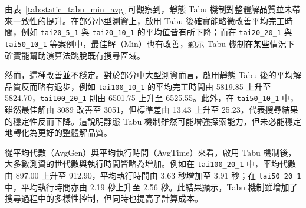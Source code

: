 \documentclass[conference]{IEEEtran}
\begin{document}
\begin{table}[htbp]
\caption{比較有無static tabu mechanism之平均與最小Makespan}
\label{tab:static_tabu_min_avg}
\centering
{}
\end{table}

由表~\ref{tab:static_tabu_min_avg} 可觀察到，靜態 Tabu 機制對整體解品質並未帶來一致性的提升。在部分小型測資上，啟用 Tabu 後確實能略微改善平均完工時間，例如 \texttt{tai20\_5\_1} 與 \texttt{tai20\_10\_1} 的平均值皆有所下降；而在 \texttt{tai20\_20\_1} 與 \texttt{tai50\_10\_1} 等案例中，最佳解（Min）也有改善，顯示 Tabu 機制在某些情況下確實能幫助演算法跳脫既有搜尋區域。

然而，這種改善並不穩定。對於部分中大型測資而言，啟用靜態 Tabu 後的平均解品質反而略有退步，例如 \texttt{tai100\_10\_1} 的平均完工時間由 5819.85 上升至 5824.70，\texttt{tai100\_20\_1} 則由 6501.75 上升至 6525.55。此外，在 \texttt{tai50\_10\_1} 中，雖然最佳解由 3089 改善至 3051，但標準差由 13.43 上升至 25.23，代表搜尋結果的穩定性反而下降。這說明靜態 Tabu 機制雖然可能增強探索能力，但未必能穩定地轉化為更好的整體解品質。

從平均代數（AvgGen）與平均執行時間（AvgTime）來看，啟用 Tabu 機制後，大多數測資的世代數與執行時間皆略為增加。例如在 \texttt{tai100\_20\_1} 中，平均代數由 897.00 上升至 912.90，平均執行時間由 3.63 秒增加至 3.91 秒；在 \texttt{tai50\_20\_1} 中，平均執行時間亦由 2.19 秒上升至 2.56 秒。此結果顯示，Tabu 機制雖增加了搜尋過程中的多樣性控制，但同時也提高了計算成本。
\end{document}
